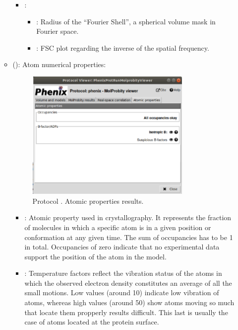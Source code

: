 \begin{itemize}
\begin{itemize}
\begin{itemize}
         \item {}:
          \begin{itemize}
           \item {}: Radius of the ``Fourier Shell'', a spherical volume mask in Fourier space.
           \item {}: FSC plot regarding the inverse of the spatial frequency.
          \end{itemize}
        \end{itemize}
      \item {} (): Atom numerical properties:
       \begin{figure}[H]
         \centering 
         \captionsetup{width=.7\linewidth} 
         \includegraphics[width=0.80\textwidth]{Images_appendix/Fig147.pdf}
         \caption{Protocol . Atomic properties results.}
         \label{fig:app_protocol_molprobity_5}
        \end{figure}
        \begin{itemize}
         \item {}: Atomic property used in crystallography. It represents the fraction of molecules in which a specific atom is in a given position or conformation at any given time. The sum of occupancies has to be 1 in total. Occupancies of zero indicate that no experimental data support the position of the atom in the model.
         \item {}: Temperature factors reflect the vibration status of the atoms in which the observed electron density constitutes an average of all the small motions. Low values (around 10) indicate low vibration of atoms, whereas high values (around 50) show atoms moving so much that locate them propperly results difficult. This last is usually the case of atoms located at the protein surface.

\end{itemize}
\end{itemize}
\end{itemize}
